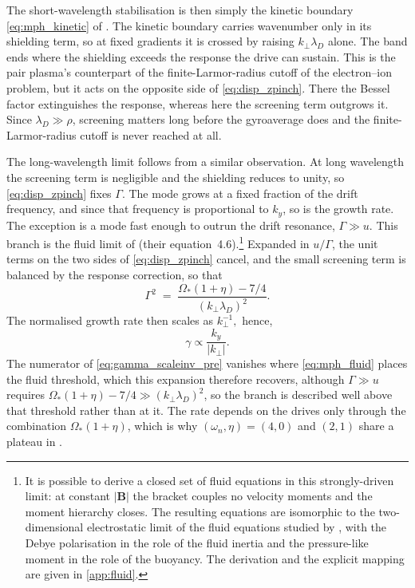 \documentclass{jpp}
\newcommand{\bB}{\mathbf{B}}
\newcommand{\kperp}{k_\perp}
\newcommand{\lambdaD}{\lambda_D}
\begin{document}
The short-wavelength stabilisation is then simply the kinetic boundary \cref{eq:mph_kinetic} of \citet{MPH2018}. The kinetic boundary carries wavenumber only in its shielding term, so at fixed gradients it is crossed by raising $\kperp\lambdaD$ alone. The band ends where the shielding exceeds the response the drive can sustain. This is the pair plasma's counterpart of the finite-Larmor-radius cutoff of the electron--ion problem, but it acts on the opposite side of \cref{eq:disp_zpinch}. There the Bessel factor extinguishes the response, whereas here the screening term outgrows it. Since $\lambdaD\gg\rho$, screening matters long before the gyroaverage does and the finite-Larmor-radius cutoff is never reached at all.

The long-wavelength limit follows from a similar observation. At long wavelength the screening term is negligible and the shielding reduces to unity, so \cref{eq:disp_zpinch} fixes $\Gamma$. The mode grows at a fixed fraction of the drift frequency, and since that frequency is proportional to $k_y$, so is the growth rate. The exception is a mode fast enough to outrun the drift resonance, $\Gamma\gg u$. This branch is the fluid limit of \citet{MPH2018} (their equation~4.6).\footnote{It is possible to derive a closed set of fluid equations in this strongly-driven limit: at constant $|\bB|$ the bracket couples no velocity moments and the moment hierarchy closes. The resulting equations are isomorphic to the two-dimensional electrostatic limit of the fluid equations studied by \citet{ClarkeUnpub}, with the Debye polarisation in the role of the fluid inertia and the pressure-like moment in the role of the buoyancy. The derivation and the explicit mapping are given in \cref{app:fluid}.} Expanded in $u/\Gamma$, the unit terms on the two sides of \cref{eq:disp_zpinch} cancel, and the small screening term is balanced by the response correction, so that
\begin{equation}\label{eq:gamma_scaleinv_pre}
\Gamma^2 \;=\; \frac{\Omega_*(1+\eta) - 7/4}{(\kperp\lambdaD)^2}.
\end{equation}
The normalised growth rate then scales as $\kperp^{-1},$ hence,
\begin{equation} \label{eq:gamma_scaleinv}
    \gamma \propto \frac{k_{y}}{|\kperp|}.\end{equation}
The numerator of \cref{eq:gamma_scaleinv_pre} vanishes where \cref{eq:mph_fluid} places the fluid threshold, which this expansion therefore recovers, although $\Gamma\gg u$ requires $\Omega_*(1+\eta) - 7/4 \gg (\kperp\lambdaD)^2$, so the branch is described well above that threshold rather than at it. The rate depends on the drives only through the combination $\Omega_*(1+\eta)$, which is why $(\omega_n,\eta) = (4,0)$ and $(2,1)$ share a plateau in .
\end{document}
